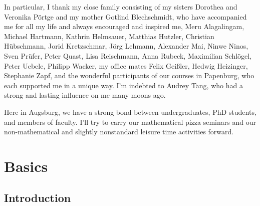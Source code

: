 \documentclass[10pt,reqno,a4paper]{amsbook}
\theoremstyle{definition}
\theoremstyle{plain}
\theoremstyle{remark}
\newcommand{\?}{\,{:}\,}
\renewcommand{\_}{\mathpunct{.}\,}
\begin{document}
{In particular, I thank my close family consisting of my sisters Dorothea and
Veronika Pörtge and my mother Gotlind Blechschmidt, who have accompanied me for
all my life and always encouraged and inspired me, Meru Alagalingam,
Michael Hartmann, Kathrin Helmsauer, Matthias Hutzler,
Christian Hübschmann, Jorid Kretzschmar, Jörg Lehmann, Alex\-an\-der Mai, Ninwe
Ninos, Sven Prüfer, Peter Quast, Lisa Reisch\-mann, Anna Rubeck, Ma\-xi\-mi\-li\-an
Schlögel, Peter Uebele, Philipp Wacker, my office mates Felix Geißler, Hedwig Heizinger,
Stephanie Zapf, and the wonderful participants of our courses in Papenburg, who
each supported me in a unique way. I'm indebted to Audrey Tang, who had a
strong and lasting influence on me many moons ago.

Here in Augsburg, we have a strong bond between undergraduates, PhD students,
and members of faculty. I'll try to carry our mathematical pizza seminars and
our non-mathematical and slightly nonstandard leisure time activities forward.

}


\setcounter{tocdepth}{1}
\tableofcontents


\chapter{Basics}

\section{Introduction}
\end{document}
